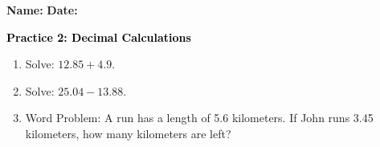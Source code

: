 \documentclass[12pt, letterpaper, fleqn]{article}
\begin{document}
\textbf{Name:} \underline{\hspace{5cm}}
\hfill
\textbf{Date:} \underline{\hspace{3cm}}\\

\begin{tcolorbox}[colback=customteal!20]
    \large\textcolor{black}{\textbf{Practice 2: Decimal Calculations}}
\end{tcolorbox}
\begin{enumerate}[itemsep=3.5cm, leftmargin=0.6cm]
\item Solve: $12.85 + 4.9$.
\vspace{3.5cm}
\item Solve: $25.04 - 13.88$.
\vspace{3.5cm}
\item Word Problem: A run has a length of 5.6 kilometers. If John runs 3.45 kilometers, how many kilometers are left?
\end{enumerate}
\end{document}
